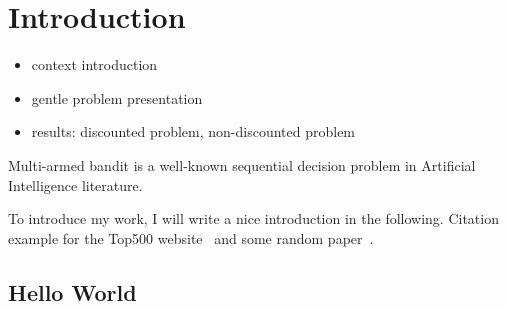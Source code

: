 \chapter{Introduction}
\label{chapter:introduction}

\begin{itemize}
    \item context introduction
    \item gentle problem presentation
    \item results: discounted problem, non-discounted problem
\end{itemize}

Multi-armed bandit is a well-known sequential decision problem in Artificial Intelligence literature.

To introduce my work, I will write a nice introduction in the following.
Citation example for the Top500 website~\cite{top500} and some random paper~\cite{graham1969}.

\section{Hello World}
\lipsum[1-5]
